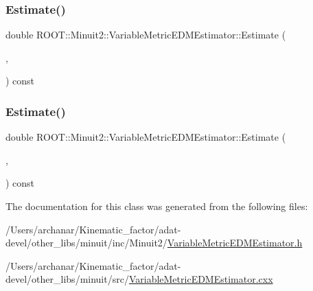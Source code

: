 \mbox{\label{classROOT_1_1Minuit2_1_1VariableMetricEDMEstimator_a3c4d22f40ab9ea39de88cca47ddfcb5f}} 
\subsubsection{\texorpdfstring{Estimate()}{Estimate()}\hspace{0.1cm}{\footnotesize\ttfamily [2/3]}}
{\footnotesize\ttfamily double R\+O\+O\+T\+::\+Minuit2\+::\+Variable\+Metric\+E\+D\+M\+Estimator\+::\+Estimate (\begin{DoxyParamCaption}\item[{const \mbox{\hyperlink{classROOT_1_1Minuit2_1_1FunctionGradient}{Function\+Gradient}} \&}]{,  }\item[{const \mbox{\hyperlink{classROOT_1_1Minuit2_1_1MinimumError}{Minimum\+Error}} \&}]{ }\end{DoxyParamCaption}) const}

\mbox{\label{classROOT_1_1Minuit2_1_1VariableMetricEDMEstimator_a3c4d22f40ab9ea39de88cca47ddfcb5f}} 
\subsubsection{\texorpdfstring{Estimate()}{Estimate()}\hspace{0.1cm}{\footnotesize\ttfamily [3/3]}}
{\footnotesize\ttfamily double R\+O\+O\+T\+::\+Minuit2\+::\+Variable\+Metric\+E\+D\+M\+Estimator\+::\+Estimate (\begin{DoxyParamCaption}\item[{const \mbox{\hyperlink{classROOT_1_1Minuit2_1_1FunctionGradient}{Function\+Gradient}} \&}]{,  }\item[{const \mbox{\hyperlink{classROOT_1_1Minuit2_1_1MinimumError}{Minimum\+Error}} \&}]{ }\end{DoxyParamCaption}) const}



The documentation for this class was generated from the following files\+:\begin{DoxyCompactItemize}
\item 
/\+Users/archanar/\+Kinematic\+\_\+factor/adat-\/devel/other\+\_\+libs/minuit/inc/\+Minuit2/\mbox{\hyperlink{adat-devel_2other__libs_2minuit_2inc_2Minuit2_2VariableMetricEDMEstimator_8h}{Variable\+Metric\+E\+D\+M\+Estimator.\+h}}\item 
/\+Users/archanar/\+Kinematic\+\_\+factor/adat-\/devel/other\+\_\+libs/minuit/src/\mbox{\hyperlink{adat-devel_2other__libs_2minuit_2src_2VariableMetricEDMEstimator_8cxx}{Variable\+Metric\+E\+D\+M\+Estimator.\+cxx}}\end{DoxyCompactItemize}
